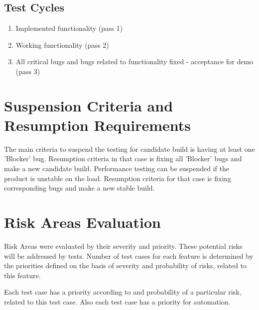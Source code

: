 \documentclass[a4paper,11pt]{article}
\begin{document}
\subsection{Test Cycles}
\begin{enumerate}
\item Implemented functionality (pass 1)
\item Working functionality (pass 2)
\item All critical bugs and bugs related to functionality fixed - acceptance for demo (pass 3)
\end{enumerate}





\section{Suspension Criteria and Resumption Requirements}

The main criteria to suspend the testing for candidate build is having at least one 'Blocker' bug. Resumption criteria in that case is fixing all 'Blocker' bugs and make a new candidate build.
Performance testing can be suspended if the product is unstable on the load. Resumption criteria for that case is fixing corresponding bugs and make a new stable build.





\section{Risk Areas Evaluation}

Risk Areas were evaluated by their severity and priority. These potential risks will be addressed by tests. Number of test cases for each feature is determined by the priorities defined on the basis of severity and probability of risks, related to this feature.

Each test case has a priority according to and probability of a particular risk, related to this test case. Also each test case has a priority for automation.
\end{document}
